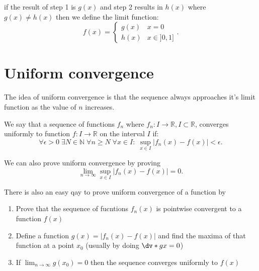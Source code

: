 \begin{remark}
	if the result of step 1 is $g(x)$ and step 2 results in $h(x)$ where $g(x)\neq h(x)$ then we define the limit function:
	\[
		f(x)=\begin{cases}g(x)&x=0\\h(x)&x\in ]0,1]\end{cases}
		.\]
\end{remark}

\section{Uniform convergence}

The idea of uniform convergence is that the sequence always approaches it's limit function as the value of $n$ increases.

\begin{definition}
	We say that a sequence of functions $f_n$ where $f_n:I \to \mathbb{R},I\subset \mathbb{R}$, converges uniformly to function $f:I\to \mathbb{R}$ on the interval $I$ if:
	\[
		\forall \epsilon>0\;\exists N\in\mathbb{N}\;\forall n\ge N\;\forall x\in I: \; \sup_{x\in I} \left| f_n(x)-f(x) \right| <\epsilon
		.\]
\end{definition}

\begin{remark}
	We can also prove uniform convergence by proving
	\[
		\lim_{n \to \infty}\sup_{x\in I} \left| f_n(x)-f(x) \right|=0
		.\]
\end{remark}

There is also an easy qay to prove uniform convergence of a function by
\begin{enumerate}
	\item Prove that the sequence of fucntions $f_n(x)$ is pointwise convergent to a function $f(x)$ 
	\item Define a function $g(x)=|f_n(x)-f(x)|$ and find the maxima of that function at a point $x_0$ (usually by doing $\dv*{g}{x} =0$)
	\item If $\lim_{n \to \infty}g(x_0)=0 $ then the sequence converges uniformly to $f(x)$
\end{enumerate}



